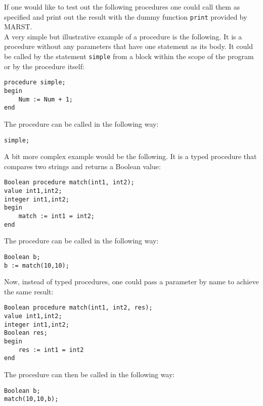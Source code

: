 \documentclass{article}
\begin{document}
If one would like to test out the following procedures one could call them as specified and print out the result with the dummy function \texttt{print} provided by MARST.\\

A very simple but illustrative example of a procedure is the following. It is a procedure without any parameters that have one statement as its body. It could be called by the statement \texttt{simple} from a block within the scope of the program or by the procedure itself:\\

\begin{lstlisting}[language={[60]algol}]
procedure simple;
begin
    Num := Num + 1;
end
\end{lstlisting}

The procedure can be called in the following way:

\begin{lstlisting}[language={[60]algol}]
simple;
\end{lstlisting}

A bit more complex example would be the following. It is a typed procedure that compares two strings and returns a Boolean value:\\

\begin{lstlisting}[language={[60]algol}]
Boolean procedure match(int1, int2);
value int1,int2;
integer int1,int2;
begin
    match := int1 = int2;
end
\end{lstlisting}

The procedure can be called in the following way:\\

\begin{lstlisting}[language={[60]algol}]
Boolean b;
b := match(10,10);
\end{lstlisting}

Now, instead of typed procedures, one could pass a parameter by name to achieve the same result:\\

\begin{lstlisting}[language={[60]algol}]
Boolean procedure match(int1, int2, res);
value int1,int2;
integer int1,int2;
Boolean res;
begin
    res := int1 = int2
end
\end{lstlisting}

The procedure can then be called in the following way:\\

\begin{lstlisting}[language={[60]algol}]
Boolean b;
match(10,10,b);
\end{lstlisting}
\end{document}
